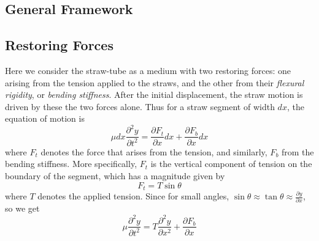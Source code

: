 \documentclass[twoside]{article}
\begin{document}
\begin{multicols}{2} %


\section{General Framework}
\subsection{Restoring Forces}
Here we consider the straw-tube as a medium with two restoring forces: one arising from the tension applied to the straws, and the other from their \emph{flexural rigidity}, or \emph{bending stiffness}.  After the initial displacement, the straw motion is driven by these the two forces alone. Thus for a straw segment of width $dx$, the equation of motion is
\begin{equation}
\mu dx \frac{\partial^2y}{\partial t^2}  = \frac{\partial F_t}{\partial x}dx + \frac{\partial F_b}{\partial x}dx 
\end{equation}
where $F_t$ denotes the force that arises from the tension, and similarly, $F_b$ from the bending stiffness. More specifically, $F_t$ is the vertical component of tension on the boundary of the segment, which has a magnitude given by
\begin{equation}
F_t = T \sin\theta 
\end{equation}
where $T$ denotes the applied tension. Since for small angles, $\sin\theta \approx \tan\theta \approx \frac{\partial y}{\partial x}$, so we get
\begin{equation}
\mu \frac{\partial ^2y}{\partial t^2}  =  T\frac{\partial^2 y}{\partial x^2} + \frac{\partial F_b}{\partial x} 
\end{equation}



\end{multicols}
\end{document}
